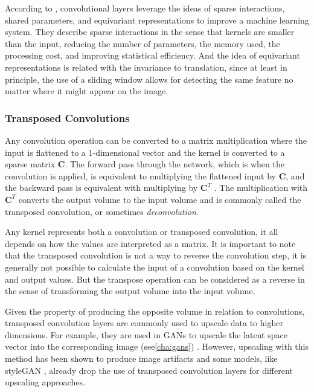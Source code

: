 According to \textcite[chap. 9]{deepLearningBook2016}, convolutional layers leverage the ideas of sparse interactions, shared parameters, and equivariant representations to improve a machine learning system. They describe sparse interactions in the sense that kernels are smaller than the input, reducing the number of parameters, the memory used, the processing cost, and improving statistical efficiency. And the idea of equivariant representations is related with the invariance to translation, since at least in principle, the use of a sliding window allows for detecting the same feature no matter where it might appear on the image.

\subsubsection{Transposed Convolutions}
Any convolution operation can be converted to a matrix multiplication where the input is flattened to a 1-dimensional vector and the kernel is converted to a sparse matrix $\bm{C}$. The forward pass through the network, which is when the convolution is applied, is equivalent to multiplying the flattened input by $\bm{C}$, and the backward pass is equivalent with multiplying by $\bm{C}^T$ \cite{guide_conv2018}. The multiplication with $\bm{C}^T$ converts the output volume to the input volume and is commonly called the transposed convolution, or sometimes \textit{deconvolution}.

Any kernel represents both a convolution or transposed convolution, it all depends on how the values are interpreted as a matrix. It is important to note that the transposed convolution is not a way to reverse the convolution step, it is generally not possible to calculate the input of a convolution based on the kernel and output values. But the transpose operation can be considered as a reverse in the sense of transforming the output volume into the input volume.

Given the property of producing the opposite volume in relation to convolutions, transposed convolution layers are commonly used to upscale data to higher dimensions. For example, they are used in \acp{GAN} to upscale the latent space vector into the corresponding image (see\autoref{cha:gans}) \cite{nipsGAN2017}. However, upscaling with this method has been shown to produce image artifacts \cite{deconvolutionArtifacts2016} and some models, like styleGAN \cite{styleGAN2018}, already drop the use of transposed convolution layers for different upscaling approaches.

